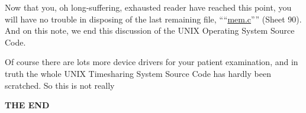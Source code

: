 \newpage
\vfill


Now that you, oh long-suffering,
exhausted reader have reached this
point, you will have no trouble in
disposing of the last remaining file,
````\href{./v6/dmr/mem.c}{mem.c}'''' (Sheet 90). And on this note,
we end this discussion of the UNIX
Operating System Source Code.

Of course there are lots more device
drivers for your patient examination,
and in truth the whole UNIX Timesharing System Source Code has hardly
been scratched. So this is not really

\begin{center}
{\bf \large THE END}
\end{center}

